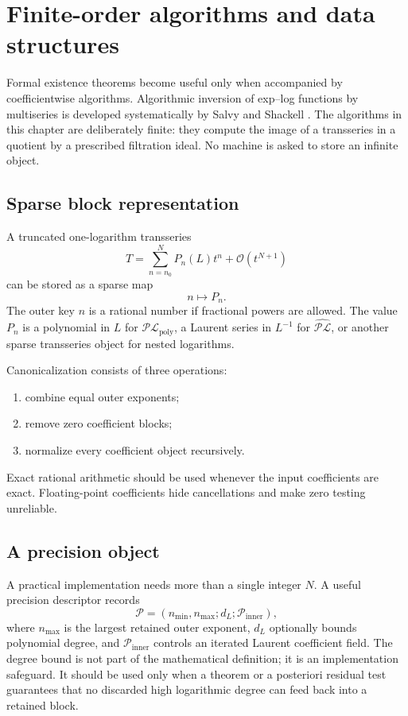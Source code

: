 \documentclass[11pt,oneside]{book}
\theoremstyle{definition}
\theoremstyle{remark}
\newcommand{\PLpoly}{\mathscr{PL}_{\mathrm{poly}}}
\newcommand{\PLfield}{\widehat{\mathscr{PL}}}
\newcommand{\bigO}{\mathcal O}
\begin{document}
\chapter{Finite-order algorithms and data structures}
\label{ch:implementation}

Formal existence theorems become useful only when accompanied by
coefficientwise algorithms. Algorithmic inversion of exp--log functions by
multiseries is developed systematically by Salvy and Shackell
\cite{SalvyShackell1999}. The algorithms in this chapter are deliberately
finite: they compute the image of a transseries in a quotient by a prescribed
filtration ideal. No machine is asked to store an infinite object.

\section{Sparse block representation}
A truncated one-logarithm transseries
\[
 T=\sum_{n=n_0}^{N}P_n(L)t^n+\bigO(t^{N+1})
\]
can be stored as a sparse map
\[
 n\longmapsto P_n.
\]
The outer key $n$ is a rational number if fractional powers are allowed.
The value $P_n$ is a polynomial in $L$ for $\PLpoly$, a Laurent series in
$L^{-1}$ for $\PLfield$, or another sparse transseries object for nested
logarithms.

Canonicalization consists of three operations:
\begin{enumerate}
\item combine equal outer exponents;
\item remove zero coefficient blocks;
\item normalize every coefficient object recursively.
\end{enumerate}
Exact rational arithmetic should be used whenever the input coefficients are
exact. Floating-point coefficients hide cancellations and make zero testing
unreliable.

\section{A precision object}
A practical implementation needs more than a single integer $N$. A useful
precision descriptor records
\[
 \mathcal P=(n_{\min},n_{\max};d_L;\mathcal P_{\mathrm{inner}}),
\]
where $n_{\max}$ is the largest retained outer exponent, $d_L$ optionally
bounds polynomial degree, and $\mathcal P_{\mathrm{inner}}$ controls an
iterated Laurent coefficient field. The degree bound is not part of the
mathematical definition; it is an implementation safeguard. It should be
used only when a theorem or a posteriori residual test guarantees that no
discarded high logarithmic degree can feed back into a retained block.
\end{document}
